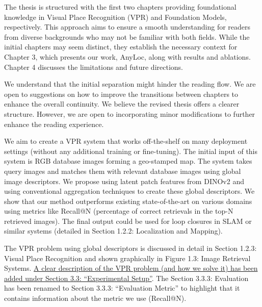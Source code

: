 \pagebreak



The thesis is structured with the first two chapters providing
foundational knowledge in Visual Place Recognition (VPR) and
Foundation Models, respectively. This approach aims to ensure a smooth
understanding for readers from diverse backgrounds who may not be
familiar with both fields. While the initial chapters may seem
distinct, they establish the necessary context for Chapter 3, which
presents our work, AnyLoc, along with results and ablations. Chapter 4
discusses the limitations and future directions.

We understand that the initial separation might hinder the reading
flow. We are open to suggestions on how to improve the transitions
between chapters to enhance the overall continuity. We believe the
revised thesis offers a clearer structure. However, we are open to
incorporating minor modifications to further enhance the reading
experience.



We aim to create a VPR system that works off-the-shelf on many
deployment settings (without any additional training or fine-tuning).
The initial input of this system is RGB database images forming a
geo-stamped map. The system takes query images and matches them with
relevant database images using global image descriptors. We propose
using latent patch features from DINOv2 and using conventional
aggregation techniques to create these global descriptors. We show
that our method outperforms existing state-of-the-art on various
domains using metrics like Recall@N (percentage of correct retrievals
in the top-N retrieved images). The final output could be used for
loop closures in SLAM or similar systems (detailed in Section 1.2.2:
Localization and Mapping).

The VPR problem using global descriptors is discussed in detail in
Section 1.2.3: Visual Place Recognition and shown graphically in
Figure 1.3: Image Retrieval Systems. \ul{A clear description of the
VPR problem (and how we solve it) has been added under Section 3.3:
``Experimental Setup''}. The Section 3.3.3: Evaluation has been
renamed to Section 3.3.3: ``Evaluation Metric'' to highlight that it
contains information about the metric we use (Recall@N).

